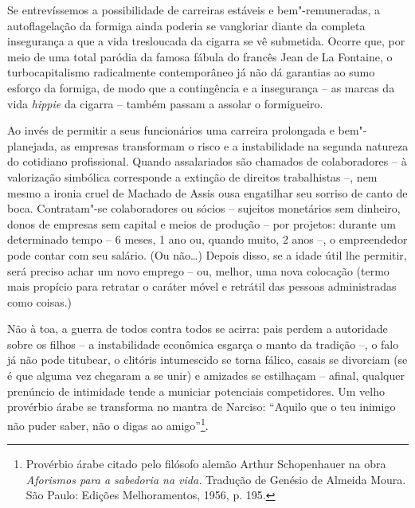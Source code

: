 Se entrevíssemos a possibilidade de carreiras estáveis e
bem"-remuneradas, a autoflagelação da formiga ainda poderia se vangloriar
diante da completa insegurança a que a vida tresloucada da cigarra se vê
submetida. Ocorre que, por meio de uma total paródia da famosa fábula do
francês Jean de La Fontaine, o turbocapitalismo radicalmente
contemporâneo já não dá garantias ao sumo esforço da formiga, de modo
que a contingência e a insegurança -- as marcas da vida \emph{hippie} da
cigarra -- também passam a assolar o formigueiro.

Ao invés de permitir a seus funcionários uma carreira prolongada e
bem"-planejada, as empresas transformam o risco e a instabilidade na
segunda natureza do cotidiano profissional. Quando assalariados são
chamados de colaboradores -- à valorização simbólica corresponde a
extinção de direitos trabalhistas --, nem mesmo a ironia cruel de
Machado de Assis ousa engatilhar seu sorriso de canto de boca.
Contratam"-se colaboradores ou sócios -- sujeitos monetários sem
dinheiro, donos de empresas sem capital e meios de produção -- por
projetos: durante um determinado tempo -- 6 meses, 1 ano ou, quando
muito, 2 anos --, o empreendedor pode contar com seu salário. (Ou
não\ldots{}) Depois disso, se a idade útil lhe permitir, será preciso achar
um novo emprego -- ou, melhor, uma nova colocação (termo mais propício
para retratar o caráter móvel e retrátil das pessoas administradas como
coisas.)

Não à toa, a guerra de todos contra todos se acirra: pais perdem a
autoridade sobre os filhos -- a instabilidade econômica esgarça o manto
da tradição --, o falo já não pode titubear, o clitóris intumescido se
torna fálico, casais se divorciam (se é que alguma vez chegaram a se
unir) e amizades se estilhaçam -- afinal, qualquer prenúncio de
intimidade tende a municiar potenciais competidores. Um velho provérbio
árabe se transforma no mantra de Narciso: ``Aquilo que o teu inimigo não
puder saber, não o digas ao amigo''\footnote{Provérbio árabe citado pelo
  filósofo alemão Arthur Schopenhauer na obra \emph{Aforismos para a
  sabedoria na vida.} Tradução de Genésio de Almeida Moura. São Paulo:
  Edições Melhoramentos, 1956, p. 195.}.

